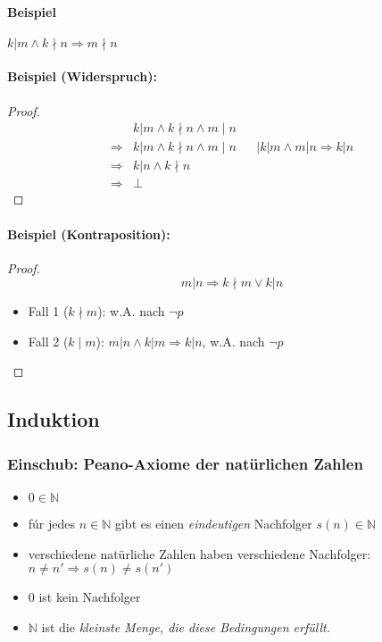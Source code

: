 \documentclass[10pt,a4paper]{article}
\begin{document}
\paragraph{Beispiel}
$k|m\land k\nmid n \Rightarrow m\nmid n$
\paragraph{Beispiel (Widerspruch):}
\begin{proof}
\begin{align*}
&k|m\land k\nmid n \land m\mid n \\
\Rightarrow &k|m\land k\nmid n \land m\mid n && \mid k|m \land m|n \Rightarrow k|n \\
\Rightarrow &k|n \land k\nmid n \\
\Rightarrow &\bot
\end{align*}
\end{proof}

\paragraph{Beispiel (Kontraposition):}
\begin{proof}
\[
m|n \Rightarrow k\nmid m \lor k|n
\]
\begin{itemize}
\item Fall 1 ($k\nmid m$): w.A. nach $\neg p$
\item Fall 2 ($k\mid m$): $m|n \land k|m \Rightarrow k|n$, w.A. nach $\neg p$
\end{itemize}
\end{proof}

\subsection{Induktion}
\subsubsection{Einschub: Peano-Axiome der natürlichen Zahlen}
\begin{itemize}
\item $0\in\mathbb{N}$
\item fúr jedes $n\in\mathbb{N}$ gibt es einen \emph{eindeutigen} Nachfolger $s(n)\in\mathbb{N}$
\item verschiedene natürliche Zahlen haben verschiedene Nachfolger:\\
$n\neq n' \Rightarrow s(n) \neq s(n')$
\item $0$ ist kein Nachfolger
\item $\mathbb{N}$ ist die \emph{kleinste Menge, die diese Bedingungen erfüllt.}
\end{itemize}
\end{document}
